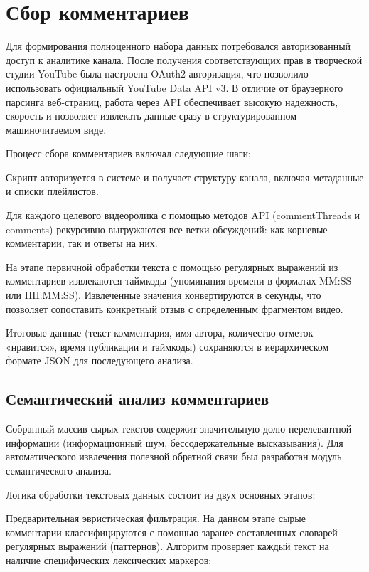 \documentclass[times]{itmo-student-thesis}
\begin{document}
\section{Сбор комментариев}

Для формирования полноценного набора данных потребовался авторизованный доступ к аналитике канала. После получения соответствующих прав в творческой студии YouTube была настроена OAuth2-авторизация, что позволило использовать официальный YouTube Data API v3. В отличие от браузерного парсинга веб-страниц, работа через API обеспечивает высокую надежность, скорость и позволяет извлекать данные сразу в структурированном машиночитаемом виде.

Процесс сбора комментариев включал следующие шаги:

Скрипт авторизуется в системе и получает структуру канала, включая метаданные и списки плейлистов.

Для каждого целевого видеоролика с помощью методов API (commentThreads и comments) рекурсивно выгружаются все ветки обсуждений: как корневые комментарии, так и ответы на них.

На этапе первичной обработки текста с помощью регулярных выражений из комментариев извлекаются таймкоды (упоминания времени в форматах MM:SS или HH:MM:SS). Извлеченные значения конвертируются в секунды, что позволяет сопоставить конкретный отзыв с определенным фрагментом видео.

Итоговые данные (текст комментария, имя автора, количество отметок «нравится», время публикации и таймкоды) сохраняются в иерархическом формате JSON для последующего анализа.

\subsection{Семантический анализ комментариев}

Собранный массив сырых текстов содержит значительную долю нерелевантной информации (информационный шум, бессодержательные высказывания). Для автоматического извлечения полезной обратной связи был разработан модуль семантического анализа.

Логика обработки текстовых данных состоит из двух основных этапов:

Предварительная эвристическая фильтрация. На данном этапе сырые комментарии классифицируются с помощью заранее составленных словарей регулярных выражений (паттернов). Алгоритм проверяет каждый текст на наличие специфических лексических маркеров:
\end{document}
